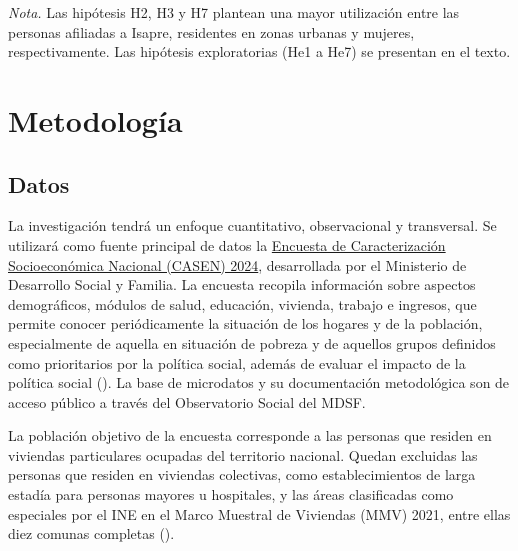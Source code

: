 \documentclass[
  spanish,
  a4paper,
  oneside]{scrbook}
\begin{document}
\emph{Nota.} Las hipótesis H2, H3 y H7 plantean una mayor utilización
entre las personas afiliadas a Isapre, residentes en zonas urbanas y
mujeres, respectivamente. Las hipótesis exploratorias (He1 a He7) se
presentan en el texto.


\chapter{Metodología}\label{metodologuxeda}

\section{Datos}\label{datos}

La investigación tendrá un enfoque cuantitativo, observacional y
transversal. Se utilizará como fuente principal de datos la
\href{https://observatorio.ministeriodesarrollosocial.gob.cl/encuesta-casen-2024}{Encuesta
de Caracterización Socioeconómica Nacional (CASEN) 2024}, desarrollada
por el Ministerio de Desarrollo Social y Familia. La encuesta recopila
información sobre aspectos demográficos, módulos de salud, educación,
vivienda, trabajo e ingresos, que permite conocer periódicamente la
situación de los hogares y de la población, especialmente de aquella en
situación de pobreza y de aquellos grupos definidos como prioritarios
por la política social, además de evaluar el impacto de la política
social (). La base de microdatos y su documentación metodológica
son de acceso público a través del Observatorio Social del MDSF.

La población objetivo de la encuesta corresponde a las personas que
residen en viviendas particulares ocupadas del territorio nacional.
Quedan excluidas las personas que residen en viviendas colectivas, como
establecimientos de larga estadía para personas mayores u hospitales, y
las áreas clasificadas como especiales por el INE en el Marco Muestral
de Viviendas (MMV) 2021, entre ellas diez comunas completas
().
\end{document}

